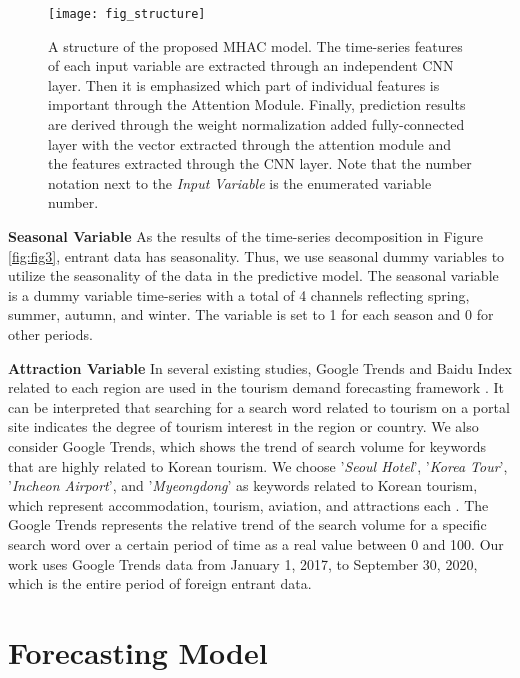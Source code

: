 \documentclass[conference]{IEEEtran}
\begin{document}
\begin{figure*}
\begin{center}
\texttt{[image: fig\_structure]}
\end{center}
   \caption{A structure of the proposed MHAC model. The time-series features of each input variable are extracted through an independent CNN layer. Then it is emphasized which part of individual features is important through the Attention Module. Finally, prediction results are derived through the weight normalization added fully-connected layer with the vector extracted through the attention module and the features extracted through the CNN layer. Note that the number notation next to the \textit{Input Variable} is the enumerated variable number.}
\label{fig:fig5}
\end{figure*}

\noindent \textbf{Seasonal Variable} As the results of the time-series decomposition in Figure \ref{fig:fig3}, entrant data has seasonality. Thus, we use seasonal dummy variables to utilize the seasonality of the data in the predictive model. The seasonal variable is a dummy variable time-series with a total of 4 channels reflecting spring, summer, autumn, and winter. The variable is set to 1 for each season and 0 for other periods.

\noindent \textbf{Attraction Variable} In several existing studies, Google Trends and Baidu Index related to each region are used in the tourism demand forecasting framework \cite{bangwayo2015can, choi2012predicting, onder2016forecasting}. It can be interpreted that searching for a search word related to tourism on a portal site indicates the degree of tourism interest in the region or country. We also consider Google Trends, which shows the trend of search volume for keywords that are highly related to Korean tourism. We choose '\textit{Seoul Hotel}', '\textit{Korea Tour}', '\textit{Incheon Airport}', and '\textit{Myeongdong}' as keywords related to Korean tourism, which represent accommodation, tourism, aviation, and attractions each \cite{park}. The Google Trends represents the relative trend of the search volume for a specific search word over a certain period of time as a real value between 0 and 100. Our work uses Google Trends data from January 1, 2017, to September 30, 2020, which is the entire period of foreign entrant data.

\section{Forecasting Model}
\end{document}
